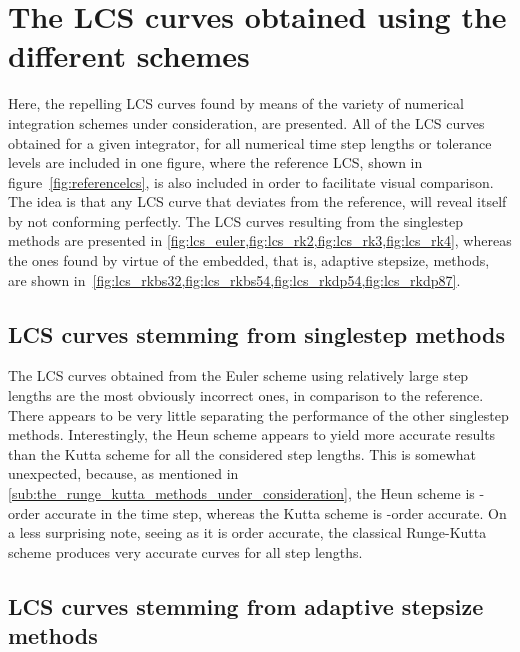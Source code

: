 \section{The LCS curves obtained using the different schemes}
\label{sec:the_lcs_curves_obtained_using_the_different_schemes}

Here, the repelling LCS curves found by means of the variety of
numerical integration schemes under consideration, are presented. All of the
LCS curves obtained for a given integrator, for all numerical time step lengths
or tolerance levels are included in one figure, where the reference LCS, shown
in figure~\ref{fig:referencelcs}, is also included in order to facilitate
visual comparison. The idea is that any LCS curve that deviates from the
reference, will reveal itself by not conforming perfectly. The LCS curves
resulting from the singlestep methods are presented in
\cref{fig:lcs_euler,fig:lcs_rk2,fig:lcs_rk3,fig:lcs_rk4}, whereas the ones
found by virtue of the embedded, that is, adaptive stepsize, methods, are
shown in~\cref{fig:lcs_rkbs32,fig:lcs_rkbs54,fig:lcs_rkdp54,fig:lcs_rkdp87}.

\subsection{LCS curves stemming from singlestep methods}
\label{sub:lcs_curves_stemming_from_singlestep_methods}








The LCS curves obtained from the Euler scheme using relatively large step
lengths are the most obviously incorrect ones, in comparison to the reference.
There appears to be very little separating the performance of the other
singlestep methods. Interestingly, the Heun scheme appears to yield more
accurate results than the Kutta scheme for all the considered step lengths.
This is somewhat unexpected, because, as mentioned in
\cref{sub:the_runge_kutta_methods_under_consideration}, the Heun scheme is
-order accurate in the time step, whereas the Kutta scheme is
-order accurate. On a less surprising note, seeing as it is order
accurate, the classical Runge-Kutta scheme produces very accurate curves for
all step lengths.

\subsection{LCS curves stemming from adaptive stepsize methods}
\label{sub:lcs_curves_stemming_from_adaptive_stepsize_methods}

